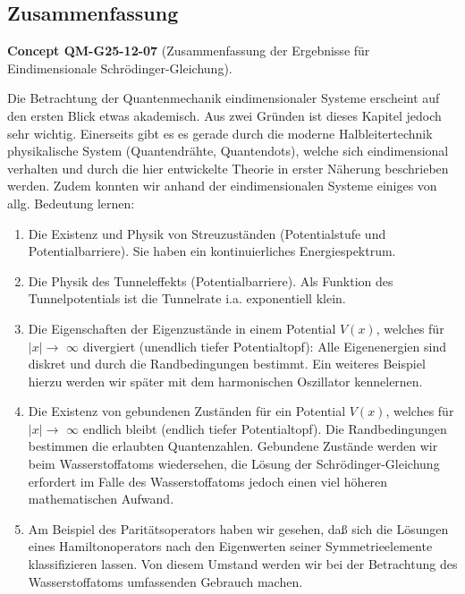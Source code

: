 \documentclass[10pt, letterpaper]{article}
\newcommand{\CustomHeading}[3]{%
  \par\medskip\noindent%
  \textbf{#1 #2} \textnormal{(#3)}.\enskip%
}
\newenvironment{CONC}[2]{\begin{unitbox}\CustomHeading{Concept}{#1}{#2}}{\end{unitbox}}
\begin{document}
\subsection{Zusammenfassung}


\begin{CONC}{QM-G25-12-07}{Zusammenfassung der Ergebnisse für Eindimensionale Schrödinger-Gleichung}
Die Betrachtung der Quantenmechanik eindimensionaler Systeme erscheint auf den ersten Blick etwas akademisch. Aus zwei Gründen ist dieses Kapitel jedoch sehr wichtig. Einerseits gibt es es gerade durch die moderne Halbleitertechnik physikalische System (Quantendrähte, Quantendots), welche sich eindimensional verhalten und durch die hier entwickelte Theorie in erster Näherung beschrieben werden. Zudem konnten wir anhand der eindimensionalen Systeme einiges von allg. Bedeutung lernen:

\begin{enumerate}
  \item Die Existenz und Physik von Streuzuständen (Potentialstufe und Potentialbarriere). Sie haben ein kontinuierliches Energiespektrum.
  \item Die Physik des Tunneleffekts (Potentialbarriere). Als Funktion des Tunnelpotentials ist die Tunnelrate i.a. exponentiell klein.
  \item Die Eigenschaften der Eigenzustände in einem Potential $V(x)$, welches für $|x| \rightarrow$ $\infty$ divergiert (unendlich tiefer Potentialtopf): Alle Eigenenergien sind diskret und durch die Randbedingungen bestimmt. Ein weiteres Beispiel hierzu werden wir später mit dem harmonischen Oszillator kennelernen.
  \item Die Existenz von gebundenen Zuständen für ein Potential $V(x)$, welches für $|x| \rightarrow$ $\infty$ endlich bleibt (endlich tiefer Potentialtopf). Die Randbedingungen bestimmen die erlaubten Quantenzahlen. Gebundene Zustände werden wir beim Wasserstoffatoms wiedersehen, die Lösung der Schrödinger-Gleichung erfordert im Falle des Wasserstoffatoms jedoch einen viel höheren mathematischen Aufwand.
  \item Am Beispiel des Paritätsoperators haben wir gesehen, daß sich die Lösungen eines Hamiltonoperators nach den Eigenwerten seiner Symmetrieelemente klassifizieren lassen. Von diesem Umstand werden wir bei der Betrachtung des Wasserstoffatoms umfassenden Gebrauch machen.
\end{enumerate}
\end{CONC}
\end{document}
